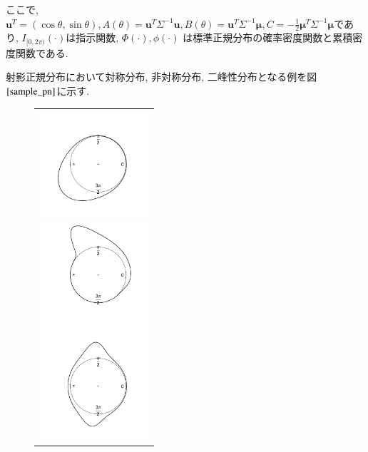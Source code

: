 \documentclass[a4j,11pt]{jarticle}
\begin{document}
\noindent
ここで, $\bm u^T = (\cos\theta,\sin\theta), A(\theta) = \bm u^T\Sigma^{-1}\bm u, B(\theta) = \bm u^T \Sigma^{-1} \bm \mu, C = -\frac{1}{2} \bm \mu^T \Sigma^{-1} \bm \mu$であり, $I_{[0,2\pi)} (\cdot)$は指示関数, $\Phi(\cdot), \phi(\cdot)$ は標準正規分布の確率密度関数と累積密度関数である.

射影正規分布において対称分布, 非対称分布, 二峰性分布となる例を図$\ref{sample_pn}$に示す. 

\vspace{-0.5zh}
\begin{figure}[h]
 \begin{tabular}{c}
\hspace{0.5cm}
 \begin{minipage}{0.33\hsize}
  \begin{center}
   \includegraphics[clip,height= 40mm]{data/sample_symmetry.png}
  \end{center}
 \end{minipage}
\hspace{-1.0cm}
 \begin{minipage}{0.33\hsize}
  \begin{center}
 \includegraphics[clip,height= 40mm]{data/sample_asymmetry.png}
  \end{center}
 \end{minipage}
\hspace{-1.0cm}
 \begin{minipage}{0.33\hsize}
  \begin{center}
   \includegraphics[clip,height= 40mm]{data/sample_bimodal.png}

\end{center}
\end{minipage}
\end{tabular}
\end{figure}
\end{document}
